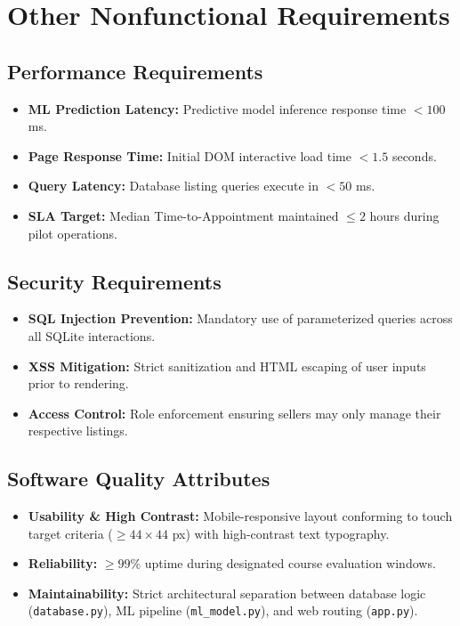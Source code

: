 \documentclass[11pt,a4paper]{article}
\begin{document}
\newpage
\section{Other Nonfunctional Requirements}

\subsection{Performance Requirements}
\begin{itemize}[leftmargin=0.8cm]
    \item \textbf{ML Prediction Latency:} Predictive model inference response time $< 100$ ms.
    \item \textbf{Page Response Time:} Initial DOM interactive load time $< 1.5$ seconds.
    \item \textbf{Query Latency:} Database listing queries execute in $< 50$ ms.
    \item \textbf{SLA Target:} Median Time-to-Appointment maintained $\le 2$ hours during pilot operations.
\end{itemize}

\subsection{Security Requirements}
\begin{itemize}[leftmargin=0.8cm]
    \item \textbf{SQL Injection Prevention:} Mandatory use of parameterized queries across all SQLite interactions.
    \item \textbf{XSS Mitigation:} Strict sanitization and HTML escaping of user inputs prior to rendering.
    \item \textbf{Access Control:} Role enforcement ensuring sellers may only manage their respective listings.
\end{itemize}

\subsection{Software Quality Attributes}
\begin{itemize}[leftmargin=0.8cm]
    \item \textbf{Usability \& High Contrast:} Mobile-responsive layout conforming to touch target criteria ($\ge 44 \times 44$ px) with high-contrast text typography.
    \item \textbf{Reliability:} $\ge 99\%$ uptime during designated course evaluation windows.
    \item \textbf{Maintainability:} Strict architectural separation between database logic (\texttt{database.py}), ML pipeline (\texttt{ml_model.py}), and web routing (\texttt{app.py}).
\end{itemize}
\end{document}
